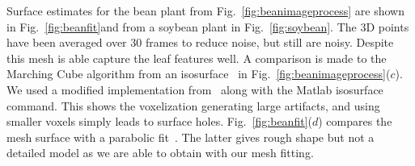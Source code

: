 Surface estimates for the bean plant from Fig.~\ref{fig:beanimageprocess} are shown in Fig.~\ref{fig:beanfit}and from a soybean plant in Fig.~\ref{fig:soybean}.   The 3D points have been averaged over 30 frames to reduce noise, but still are noisy.  Despite this mesh is able capture the leaf features well.  A comparison is made to the Marching Cube algorithm from an isosurface~\cite{Curless:1996} in Fig.~\ref{fig:beanimageprocess}($c$).  We used a modified implementation from~\cite{PVT2013} along with the Matlab isosurface command.  This shows the voxelization generating large artifacts, and using smaller voxels simply leads to surface holes.  Fig.~\ref{fig:beanfit}($d$) compares the mesh surface with a parabolic fit~\cite{Alenya2011}.  The latter gives rough shape but not a detailed model as we are able to obtain with our mesh fitting.
